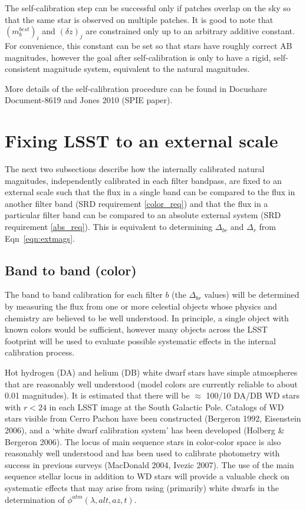 \documentclass[12pt,preprint]{aastex}
\begin{document}
The self-calibration step can be successful only if patches
overlap on the sky so that the same star is observed on 
multiple patches. It is good to note that $(m_b^{best})_{i}$ and 
$(\delta z)_j$ are constrained only up to an arbitrary 
additive constant. For convenience, this constant can be set so that
stars have roughly correct AB magnitudes, however the goal after
self-calibration is only to have a rigid, self-consistent magnitude
system, equivalent to the natural magnitudes.

More details of the self-calibration procedure can be found in
Docushare Document-8619 and Jones 2010 (SPIE paper). 


\section{Fixing LSST to an external scale}

The next two subsections describe how the internally calibrated
natural magnitudes, independently calibrated in each filter bandpass, are fixed
to an external scale such that the flux in a single band can be compared to the
flux in another filter band (SRD requirement \ref{color_req}) and that
the flux in a particular filter band can be compared to an absolute
external system (SRD requirement \ref{abs_req}). This is equivalent to
determining $\Delta_{br}$ and $\Delta_r$ from Eqn~\ref{eqn:extmags}. 

\subsection{Band to band (color)}

The band to band calibration for each filter $b$ (the $\Delta_{br}$
values) will be determined by measuring the flux from one or more
celestial objects whose physics and chemistry are believed to be well
understood. In principle, a single object with known colors would be
sufficient, however many objects across the LSST footprint
will be used to evaluate possible systematic effects in the internal
calibration process. 

Hot hydrogen (DA) and helium (DB) white dwarf stars have simple
atmospheres that are reasonably well understood (model colors are
currently reliable to about 0.01 magnitudes). It is estimated that
there will be $\approx$ 100/10 DA/DB WD stars with $r<24$ in each LSST
image at the South Galactic Pole. Catalogs of WD stars visible from
Cerro Pachon have been constructed (Bergeron 1992, Eisenstein
2006), and a `white dwarf calibration system' has been developed
(Holberg \& Bergeron 2006). The locus of main sequence stars in
color-color space is also reasonably well understood and has been used
to calibrate photometry with success in previous surveys (MacDonald
2004, Ivezic 2007). The use of the main sequence stellar locus in addition to
WD stars will provide a valuable check on systematic effects that may
arise from using (primarily) white dwarfs in the determination of
$\phi^{atm}(\lambda,alt,az,t)$. 
\end{document}
